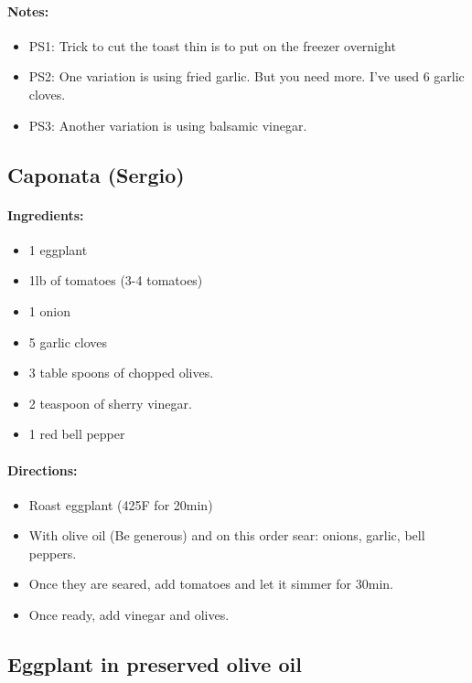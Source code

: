 \documentclass{article}
\begin{document}
\paragraph{Notes:}
\begin{itemize}
	\item PS1: Trick to cut the toast thin is to put on the freezer overnight
	\item PS2: One variation is using fried garlic. But you need more. I've used 6 garlic cloves.
	\item PS3: Another variation is using balsamic vinegar.
\end{itemize}

\subsection{Caponata (Sergio)}

\paragraph{Ingredients:}

\begin{itemize}
	\item 1 eggplant
	\item 1lb of tomatoes (3-4 tomatoes)
	\item 1 onion
	\item 5 garlic cloves
	\item 3 table spoons of chopped olives.
	\item 2 teaspoon of sherry vinegar.
	\item 1 red bell pepper
\end{itemize}

\paragraph{Directions:}
\begin{itemize}
	\item Roast eggplant (425F for 20min)
	\item With olive oil (Be generous) and on this order sear: onions, garlic, bell peppers.
	\item Once they are seared, add tomatoes and let it simmer for 30min.
	\item Once ready, add vinegar and olives.
\end{itemize}

\subsection{Eggplant in preserved olive oil}{}
\end{document}
